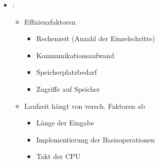 \documentclass[
    ngerman,
    color=3b,
    load_common, %
    summary,
    boxarc,
]{tuda_summary}
\begin{document}
\begin{itemize}
    \item {}:
          \begin{itemize}
              \item Effizienzfaktoren
                    \begin{itemize}
                        \item Rechenzeit (Anzahl der Einzelschritte)
                        \item Kommunikationsaufwand
                        \item Speicherplatzbedarf
                        \item Zugriffe auf Speicher
                    \end{itemize}
              \item Laufzeit hängt von versch. Faktoren ab
                    \begin{itemize}
                        \item Länge der Eingabe
                        \item Implementierung der Basisoperationen
                        \item Takt der CPU
                    \end{itemize}
          \end{itemize}

\end{itemize}
\clearpage
\end{document}
